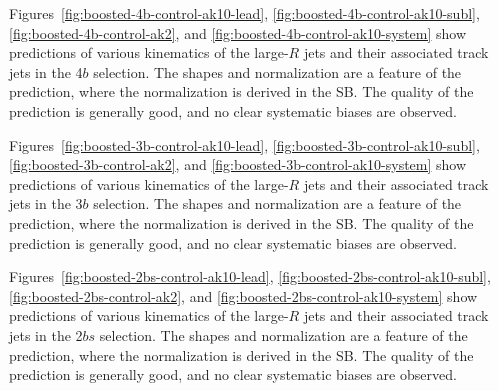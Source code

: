 Figures~\ref{fig:boosted-4b-control-ak10-lead}, \ref{fig:boosted-4b-control-ak10-subl}, \ref{fig:boosted-4b-control-ak2}, and \ref{fig:boosted-4b-control-ak10-system} show predictions of various kinematics of the large-$R$ jets and their associated track jets in the 4$b$ selection. The shapes and normalization are a feature of the prediction, where the normalization is derived in the SB. The quality of the prediction is generally good, and no clear systematic biases are observed.

Figures~\ref{fig:boosted-3b-control-ak10-lead}, \ref{fig:boosted-3b-control-ak10-subl}, \ref{fig:boosted-3b-control-ak2},  and \ref{fig:boosted-3b-control-ak10-system} show predictions of various kinematics of the large-$R$ jets and their associated track jets in the 3$b$ selection. The shapes and normalization are a feature of the prediction, where the normalization is derived in the SB. The quality of the prediction is generally good, and no clear systematic biases are observed.

Figures~\ref{fig:boosted-2bs-control-ak10-lead}, \ref{fig:boosted-2bs-control-ak10-subl}, \ref{fig:boosted-2bs-control-ak2},  and \ref{fig:boosted-2bs-control-ak10-system} show predictions of various kinematics of the large-$R$ jets and their associated track jets in the 2$bs$ selection. The shapes and normalization are a feature of the prediction, where the normalization is derived in the SB. The quality of the prediction is generally good, and no clear systematic biases are observed.


